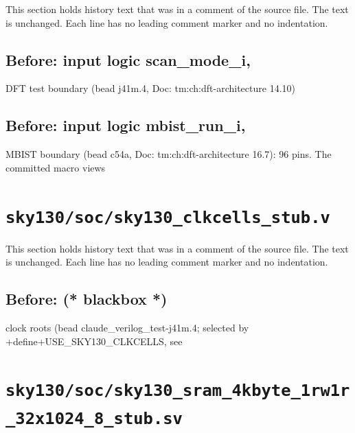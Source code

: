 This section holds history text that was in a comment of the source file. The text is unchanged. Each line has no leading comment marker and no indentation.

\begin{record}

\subsection*{Before: input  logic        scan\_mode\_i,}

\begin{textblock}
DFT test boundary (bead j41m.4, Doc: tm:ch:dft-architecture 14.10)
\end{textblock}

\subsection*{Before: input  logic        mbist\_run\_i,}

\begin{textblock}
MBIST boundary (bead c54a, Doc: tm:ch:dft-architecture 16.7): 96 pins. The committed macro views
\end{textblock}

\end{record}

\section{\texttt{sky130/soc/sky130\_clkcells\_stub.v}}\label{cr:pd:sky130-soc-sky130-clkcells-stub-v}

This section holds history text that was in a comment of the source file. The text is unchanged. Each line has no leading comment marker and no indentation.

\begin{record}

\subsection*{Before: (* blackbox *)}

\begin{textblock}
clock roots (bead claude_verilog_test-j41m.4; selected by +define+USE_SKY130_CLKCELLS, see
\end{textblock}

\end{record}

\section{\texttt{sky130/soc/sky130\_sram\_4kbyte\_1rw1r\_32x1024\_8\_stub.sv}}\label{cr:pd:sky130-soc-sky130-sram-4kbyte-1rw1r-32x1024-8-stub-sv}

